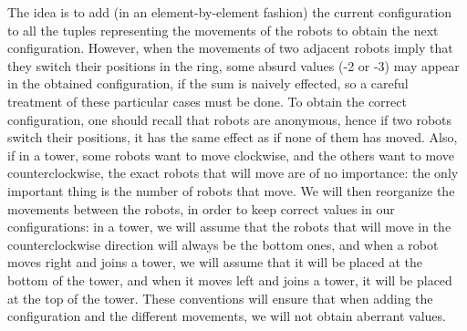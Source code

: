 \documentclass[envcountsame]{llncs} \usepackage[english]{babel}
\begin{document}
The idea is to add (in an element-by-element fashion) the current configuration to all the tuples representing the movements of the robots
to obtain the next configuration.
However, when the movements of two adjacent robots imply that they switch their positions
 in the ring, some absurd values (-2 or -3) may appear in the obtained configuration, if the sum is naively effected, so a careful
 treatment of these particular cases must be done. To obtain the correct configuration, one should recall
 that robots are anonymous, hence if two robots switch their positions, it has the same effect as if none of them has moved. Also,
 if in a tower, some robots want to move clockwise, and the others want to move counterclockwise, the exact robots that will move are of no importance:
 the only important thing is the number of robots that move. We will then reorganize the movements between the robots, in order
 to keep correct values in our configurations: in a tower, we will assume that the robots that will move in the counterclockwise direction
 will always be the bottom ones, and when a robot moves right and joins a tower, we will assume that it will be placed at the bottom of the tower,  and when it moves left and joins a tower, it will be placed at the top of the tower. These conventions will ensure that when adding the configuration  and the different movements, we will not obtain aberrant values.
 
\end{document}
